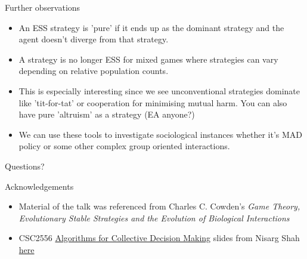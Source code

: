 \documentclass[aspectratio=169, handout]{beamer}
\begin{document}
\begin{frame}{Further observations}
    \begin{itemize}
        \item An ESS strategy is 'pure' if it ends up as the dominant strategy and the agent doesn't diverge from that strategy.
        \pause
        \item A strategy is no longer ESS for mixed games where strategies can vary depending on relative population counts.
        \pause
        \item This is especially interesting since we see unconventional strategies dominate like 'tit-for-tat' or cooperation for minimising mutual harm. You can also have pure 'altruism' as a strategy (EA anyone?)
        \pause
        \item We can use these tools to investigate sociological instances whether it's MAD policy or some other complex group oriented interactions.
    \end{itemize}
    
\end{frame}


\begin{frame}{}
      \begin{center}
    {\color{sigma@mainblue} \LARGE Questions?}
  \end{center}
\end{frame}

\begin{frame}{Acknowledgements}
    \begin{itemize}
        \item Material of the talk was referenced from Charles C. Cowden's \textit{Game Theory, Evolutionary Stable Strategies and the Evolution of Biological Interactions}
        \item CSC2556 \hyperlink{https://www.cs.toronto.edu/~nisarg/teaching/2556s21/}{Algorithms for Collective Decision Making} slides from Nisarg Shah \hyperlink{https://www.cs.toronto.edu/~nisarg/teaching/2556s21/slides/2556s21-L9.pdf}{here}
    \end{itemize}
\end{frame}
\end{document}
